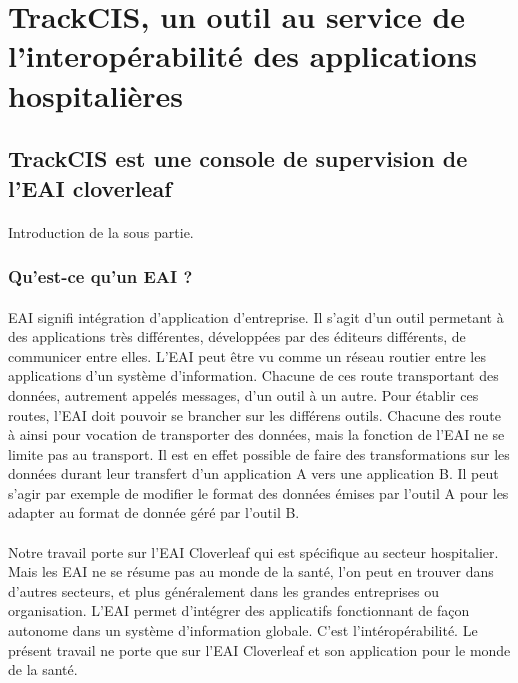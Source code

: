 \section{TrackCIS, un outil au service de l'interopérabilité des applications hospitalières}
	\paragraph{}
	

	\subsection{TrackCIS est une console de supervision de l'EAI cloverleaf}
		\paragraph{}
		Introduction de la sous partie.
		
		\subsubsection{Qu'est-ce qu'un EAI ?}
			\paragraph{} %
			EAI signifi intégration d'application d'entreprise. Il s'agit d'un outil
			permetant à des applications très différentes, développées par des éditeurs
			différents, de communicer entre elles. L'EAI peut être vu comme un réseau
			routier entre les applications d'un système d'information. Chacune de ces
			route transportant des données, autrement appelés messages, d'un outil à un
			autre. Pour établir ces routes, l'EAI doit pouvoir se brancher sur les
			différens outils.
			Chacune des route à ainsi pour vocation de transporter des données, mais la
			fonction de l'EAI ne se limite pas au transport. Il est en effet possible de
			faire des transformations sur les données durant leur transfert d'un
			application A vers une application B. Il peut s'agir par exemple de modifier
			le format des données émises par l'outil A pour les adapter au format de
			donnée géré par l'outil B.
			
			\paragraph{} %
			Notre travail porte sur l'EAI Cloverleaf qui est spécifique au secteur
			hospitalier. Mais les EAI ne se résume pas au monde de la santé, l'on peut en
			trouver dans d'autres secteurs, et plus généralement dans les grandes
			entreprises ou organisation.
			L'EAI permet d'intégrer des applicatifs fonctionnant de façon autonome dans
			un système d'information globale. C'est l'intéropérabilité.
			Le présent travail ne porte que sur l'EAI Cloverleaf et son application pour
			le monde de la santé.
			
